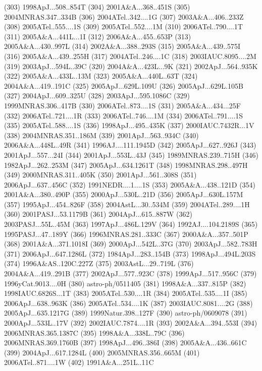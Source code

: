 (303) 1998ApJ...508..854T
(304) 2001A\&A...368..451S
(305) 2004MNRAS.347..334B
(306) 2004ATel..342....1G
(307) 2003A\&A...406..233Z
(308) 2005ATel..555....1S
(309) 2005ATel..552....1M
(310) 2006ATel..790....1T
(311) 2005A\&A...441L...1I
(312) 2006A\&A...455..653P
(313) 2005A\&A...430..997L
(314) 2002A\&A...388..293S
(315) 2005A\&A...439..575I
(316) 2005A\&A...439..255H
(317) 2004ATel..246....1C
(318) 2003IAUC.8095....2M
(319) 2003ApJ...594L..39C
(320) 2004A\&A...423L...9K
(321) 2002ApJ...564..935K
(322) 2005A\&A...433L..13M
(323) 2005A\&A...440L..63T
(324) 2004A\&A...419..191C
(325) 2005ApJ...629L.109U
(326) 2005ApJ...629L.105B
(327) 2004ApJ...609..325U
(328) 2003ApJ...595.1086C
(329) 1999MNRAS.306..417B
(330) 2006ATel..873....1S
(331) 2005A\&A...434...25F
(332) 2006ATel..721....1R
(333) 2006ATel..746....1M
(334) 2006ATel..791....1S
(335) 2005ATel..588....1S
(336) 1998ApJ...495..435K
(337) 2000IAUC.7432R...1V
(338) 2004MNRAS.351..186M
(339) 2001ApJ...563..934C
(340) 2006A\&A...448L..49R
(341) 1996AJ....111.1945D
(342) 2005ApJ...627..926J
(343) 2001ApJ...557...24I
(344) 2001ApJ...553L..43J
(345) 1989MNRAS.239..715H
(346) 1982ApJ...262..253M
(347) 2005ApJ...634.1261T
(348) 1998MNRAS.298..497H
(349) 2000MNRAS.311..405K
(350) 2001ApJ...561..308S
(351) 2006ApJ...637..456C
(352) 1991NEDR....1....1S
(353) 2005A\&A...438..121D
(354) 2001A\&A...380..490P
(355) 2000ApJ...530L..21D
(356) 2005ApJ...630L.157M
(357) 1995ApJ...454..826F
(358) 2004AstL...30..534M
(359) 2004ATel..289....1H
(360) 2001PASJ...53.1179B
(361) 2004ApJ...615..887W
(362) 2003PASJ...55L..45M
(363) 1997ApJ...486L.129V
(364) 1992AJ....104.2189S
(365) 1995PASJ...47..189Y
(366) 1996MNRAS.281..333C
(367) 2000A\&A...357..501P
(368) 2001A\&A...371.1018I
(369) 2000ApJ...542L..37G
(370) 2003ApJ...582..783H
(371) 2006ApJ...647.1286L
(372) 1984ApJ...283..154B
(373) 1998ApJ...494L.203S
(374) 1996A\&AS..120C.227Z
(375) 2003AstL...29..719L
(376) 2004A\&A...419..291B
(377) 2002ApJ...577..923C
(378) 1999ApJ...517..956C
(379) 1996yCat.9013....0H
(380) astro-ph/0511405
(381) 1998A\&A...337..815P
(382) 1998IAUC.6826S...1T
(383) 2005ATel..530....1R
(384) 2005ATel..535....1I
(385) 2006ApJ...638..963K
(386) 2005ATel..534....1K
(387) 2003IAUC.8081....2G
(388) 2005ApJ...635.1217G
(389) 1999Natur.398..127F
(390) astro-ph/0609078
(391) 2000ApJ...533L..17V
(392) 2002IAUC.7874....1R
(393) 2002A\&A...394..553I
(394) 2006MNRAS.365.1387C
(395) 1998A\&A...338L..79C
(396) 2006MNRAS.369.1760B
(397) 1998ApJ...496..386I
(398) 2005A\&A...436..661C
(399) 2004ApJ...617.1284L
(400) 2005MNRAS.356..665M
(401) 2006ATel..871....1W
(402) 1991A\&A...251L..11C
